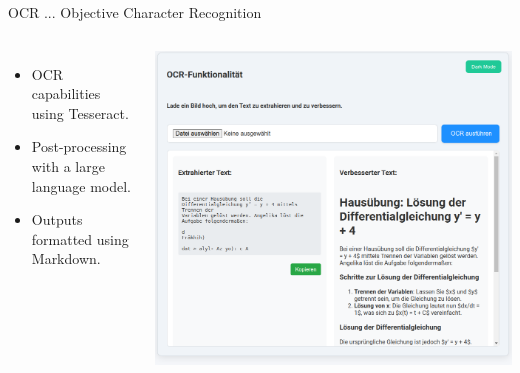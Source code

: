 \documentclass{beamer}
\begin{document}
\begin{frame}{OCR ... Objective Character Recognition}
  \begin{columns}
      \begin{itemize}
        \item OCR capabilities using Tesseract.
        \item Post-processing with a large language model.
        \item Outputs formatted using Markdown.
      \end{itemize}
      \centering
      \includegraphics[width=\textwidth]{OCR-functonalatie.png}
  \end{columns}
\end{frame}
\end{document}

